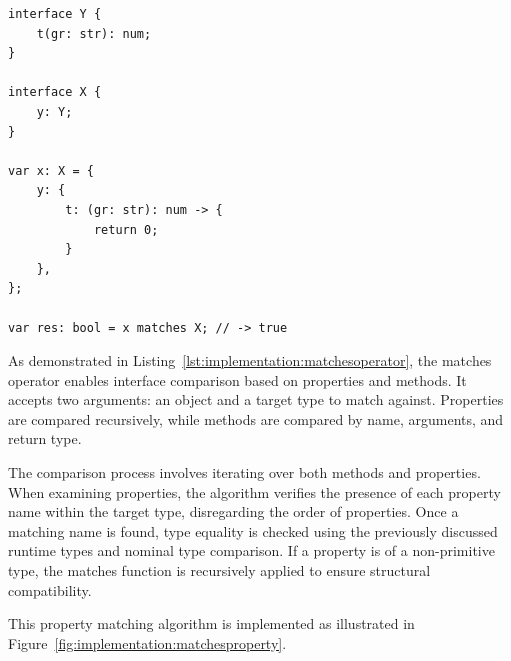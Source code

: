 \begin{lstlisting}[language=Kipper,caption=The Kipper matches operator,label=lst:implementation:matchesoperator]
interface Y {
	t(gr: str): num;
}

interface X {
	y: Y;
}

var x: X = {
	y: {
		t: (gr: str): num -> {
			return 0;
		}
	},
};

var res: bool = x matches X; // -> true
\end{lstlisting}

As demonstrated in Listing~\ref{lst:implementation:matchesoperator}, the matches operator enables interface comparison based on properties and methods. It accepts two arguments: an object and a target type to match against. Properties are compared recursively, while methods are compared by name, arguments, and return type.

The comparison process involves iterating over both methods and properties. When examining properties, the algorithm verifies the presence of each property name within the target type, disregarding the order of properties. Once a matching name is found, type equality is checked using the previously discussed runtime types and nominal type comparison. If a property is of a non-primitive type, the matches function is recursively applied to ensure structural compatibility.

This property matching algorithm is implemented as illustrated in Figure~\ref{fig:implementation:matchesproperty}.

